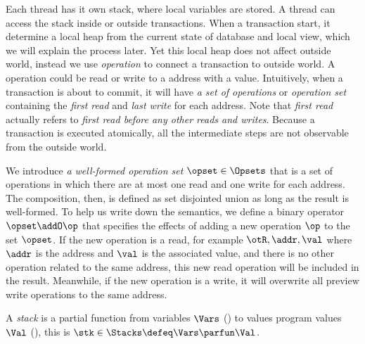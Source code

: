 Each thread has it own stack, where local variables are stored.
A thread can access the stack inside or outside transactions.
When a transaction start, it determine a local heap from the current state of database and local view, which we will explain the process later.
Yet this local heap does not affect outside world, instead we use \emph{operation} to connect a transaction to outside world.
A operation could be read or write to a address with a value.
Intuitively, when a transaction is about to commit, it will have \emph{a set of operations} or \emph{operation set} containing the \emph{first read} and \emph{last write} for each address.
Note that \emph{first read} actually refers to \emph{first read before any other reads and writes}.
Because a transaction is executed atomically, all the intermediate steps are not observable from the outside world.

We introduce \emph{a well-formed operation set} \( \opset \in \Opsets\) that is a set of operations in which there are at most one read and one write for each address.
The composition, then, is defined as set disjointed union as long as the result is well-formed.
To help us write down the semantics, we define a binary operator \( \opset \addO \op \) that specifies the effects of adding a new operation \( \op \) to the set \( \opset \).
If the new operation is a read, for example \(\otR, \addr, \val\) where \( \addr \) is the address and \( \val\) is the associated value, and there is no other operation related to the same address, this new read operation will be included in the result.
Meanwhile, if the new operation is a write, it will overwrite all preview write operations to the same address.


\begin{defn}[Stacks]
\label{def:stacks}
A \emph{stack} is a partial function from variables \( \Vars \) () to values program values \( \Val \) (), this is \( \stk \in \Stacks \defeq \Vars \parfun \Val \).
\end{defn}


